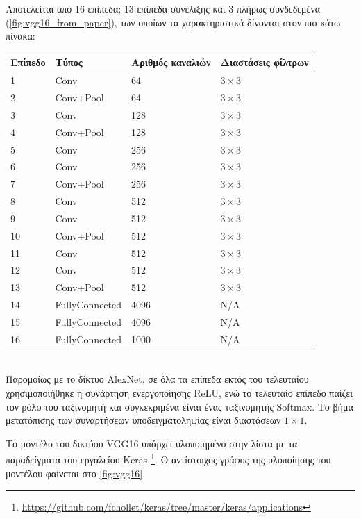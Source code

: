 Αποτελείται από 16 επίπεδα; 13 επίπεδα συνέλιξης και 3 πλήρως συνδεδεμένα (\autoref{fig:vgg16_from_paper}), των
οποίων τα χαρακτηριστικά δίνονται στον πιο κάτω πίνακα:
\\

\begin{tabular}{ | l | l | l | l | }
  \hline
  \rowcolor{Gray}
  Επίπεδο  & Τύπος & Αριθμός καναλιών & Διαστάσεις φίλτρων \\
  \hline
  1 & Conv & 64 & $3 \times 3$ \\
  2 & Conv+Pool & 64 & $3 \times 3$ \\
  3 & Conv & 128 & $3 \times 3$ \\
  4 & Conv+Pool & 128 & $3 \times 3$ \\
  5 & Conv & 256 & $3 \times 3$ \\
  6 & Conv & 256 & $3 \times 3$ \\
  7 & Conv+Pool & 256 & $3 \times 3$ \\
  8 & Conv & 512 & $3 \times 3$ \\
  9 & Conv & 512 & $3 \times 3$ \\
  10 & Conv+Pool & 512 & $3 \times 3$ \\
  11 & Conv & 512 & $3 \times 3$ \\
  12 & Conv & 512 & $3 \times 3$ \\
  13 & Conv+Pool & 512 & $3 \times 3$ \\
  14 & FullyConnected & 4096 & Ν/A \\
  15 & FullyConnected & 4096 & N/A \\
  16 & FullyConnected & 1000 & N/A \\
  \hline
\end{tabular}
\\

Παρομοίως με το δίκτυο AlexNet, σε όλα τα επίπεδα εκτός του τελευταίου χρησιμοποιήθηκε η συνάρτηση ενεργοποίησης
ReLU, ενώ το τελευταίο επίπεδο παίζει τον ρόλο του ταξινομητή και συγκεκριμένα
είναι ένας ταξινομητής Softmax. Το βήμα μετατόπισης των συναρτήσεων υποδειγματοληψίας
είναι διαστάσεων $1 \times 1$.

Το μοντέλο του δικτύου VGG16 υπάρχει υλοποιημένο στην λίστα με τα παραδείγματα
του εργαλείου Keras \footnote{\url{https://github.com/fchollet/keras/tree/master/keras/applications}}.
Ο αντίστοιχος γράφος της υλοποίησης του μοντέλου
φαίνεται στο \autoref{fig:vgg16}.

